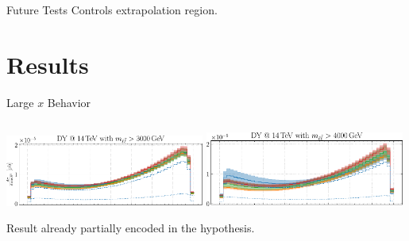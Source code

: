 \documentclass[9pt]{beamer}
\begin{document}
\begin{frame}{Future Tests}
    Controls extrapolation region.
\end{frame}

\section{Results}

\begin{frame}{Large $x$ Behavior}
    \begin{columns}
        \begin{column}{0.5\textwidth}
            \begin{tcolorbox}
                \centering
                \includegraphics[width=0.49\textwidth]{NNPDF_DY_14TEV_BSM_AFB_COS_3000}
                \includegraphics[width=0.49\textwidth]{NNPDF_DY_14TEV_BSM_AFB_COS_4000}
            \end{tcolorbox}

            \vspace*{20pt}
            Result already partially encoded in the hypothesis.
            \vspace*{20pt}


\end{column}
\end{columns}
\end{frame}
\end{document}
